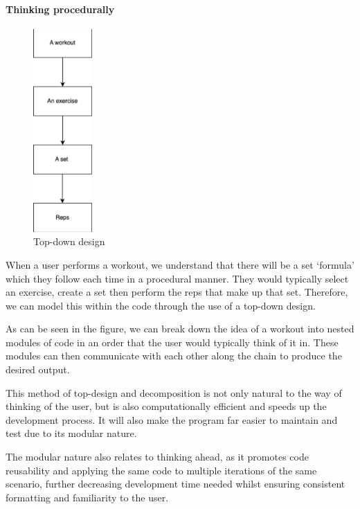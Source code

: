 \documentclass{article}
\begin{document}
\paragraph{Thinking procedurally}
\begin{figure} %
  \includegraphics[width=0.2\textwidth]{Figure 2.png}
  \caption{Top-down design}
\end{figure}
When a user performs a workout, we understand that there will be a set ‘formula’ which they follow each time in a procedural manner. They would typically select an exercise, create a set then perform the reps that make up that set. Therefore, we can model this within the code through the use of a top-down design. 

As can be seen in the figure, we can break down the idea of a workout into nested modules of code in an order that the user would typically think of it in. These modules can then communicate with each other along the chain to produce the desired output. 

This method of top-design and decomposition is not only natural to the way of thinking of the user, but is also computationally efficient and speeds up the development process. It will also make the program far easier to maintain and test due to its modular nature. 

The modular nature also relates to thinking ahead, as it promotes code reusability and applying the same code to multiple iterations of the same scenario, further decreasing development time needed whilst ensuring consistent formatting and familiarity to the user. 
\end{document}
